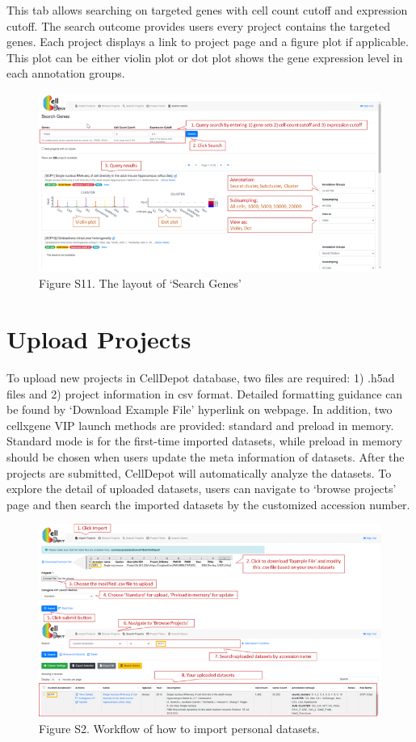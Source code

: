 \documentclass[
]{book}
\begin{document}
This tab allows searching on targeted genes with cell count cutoff and expression cutoff. The search outcome provides users every project contains the targeted genes. Each project displays a link to project page and a figure plot if applicable. This plot can be either violin plot or dot plot shows the gene expression level in each annotation groups.

\begin{figure}
\centering
\includegraphics{figures/S12.png}
\caption{Figure S11. The layout of `Search Genes'}
\end{figure}

\hypertarget{upload}{%
\section{Upload Projects}\label{upload}}

To upload new projects in CellDepot database, two files are required: 1) .h5ad files and 2) project information in csv format. Detailed formatting guidance can be found by `Download Example File' hyperlink on webpage. In addition, two cellxgene VIP launch methods are provided: standard and preload in memory. Standard mode is for the first-time imported datasets, while preload in memory should be chosen when users update the meta information of datasets.
After the projects are submitted, CellDepot will automatically analyze the datasets. To explore the detail of uploaded datasets, users can navigate to `browse projects' page and then search the imported datasets by the customized accession number.

\begin{figure}
\centering
\includegraphics{figures/S5.png}
\caption{Figure S2. Workflow of how to import personal datasets.}
\end{figure}
\end{document}
